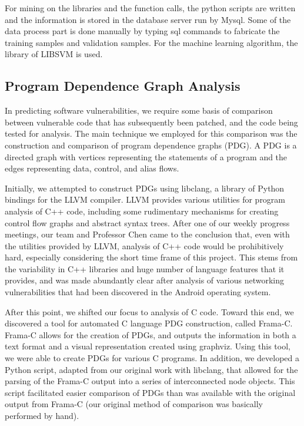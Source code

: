 \documentclass{acm_proc_article-sp}
\begin{document}
For mining on the libraries and the function calls, the python scripts are 
written and the information is stored in the database server run by Mysql. Some 
of the data process part is done manually by typing sql commands to fabricate 
the training samples and validation samples. For the machine learning 
algorithm, the library of LIBSVM is used.

\subsection{Program Dependence Graph Analysis}
In predicting software vulnerabilities, we require some basis of comparison 
between vulnerable code that has subsequently been patched, and the code being 
tested for analysis. The main technique we employed for this comparison was the 
construction and comparison of program dependence graphs (PDG). A PDG is a 
directed graph with vertices representing the statements of a program and the 
edges representing data, control, and alias flows.

Initially, we attempted to construct PDGs using libclang, a library of Python 
bindings for the LLVM compiler. LLVM provides various utilities for program 
analysis of C++ code, including some rudimentary mechanisms for creating 
control flow graphs and abstract syntax trees. After one of our weekly progress 
meetings, our team and Professor Chen came to the conclusion that, even with 
the utilities provided by LLVM, analysis of C++ code would be prohibitively 
hard, especially considering the short time frame of this project. This stems 
from the variability in C++ libraries and huge number of language features that 
it provides, and was made abundantly clear after analysis of various networking 
vulnerabilities that had been discovered in the Android operating system.

After this point, we shifted our focus to analysis of C code. Toward this end, 
we discovered a tool for automated C language PDG construction, called Frama-C. 
Frama-C allows for the creation of PDGs, and outputs the information in both a 
text format and a visual representation created using graphviz. Using this 
tool, we were able to create PDGs for various C programs. In addition, we 
developed a Python script, adapted from our original work with libclang, that 
allowed for the parsing of the Frama-C output into a series of interconnected 
node objects. This script facilitated easier comparison of PDGs than was 
available with the original output from Frama-C (our original method of 
comparison was basically performed by hand).
\end{document}
